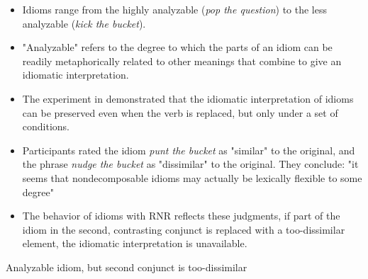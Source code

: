 \documentclass[paper=letter, fontsize=12pt]{scrartcl} %
\numberwithin{equation}{section} %
\numberwithin{figure}{section} %
\numberwithin{table}{section} %
\begin{document}
\begin{itemize}
\item Idioms range from the highly analyzable (\textit{pop the question}) to the less analyzable (\textit{kick the bucket}). \citep{Gibbs:1989,Svenonius:2005}
\item "Analyzable" refers to the degree to which the parts of an idiom can be readily metaphorically related to other meanings that combine to give an idiomatic interpretation.
\end{itemize}


\begin{itemize}
\item The experiment in \citealt{Hamblin:1999} demonstrated that the idiomatic interpretation of idioms can be preserved even when the verb is replaced, but only under a set of conditions. 
\item Participants rated the idiom \textit{punt the bucket} as "similar" to the original, and the phrase \textit{nudge the bucket} as "dissimilar" to the original. They conclude: "it seems that nondecomposable idioms may actually be lexically flexible to some degree" \cite[33]{Hamblin:1999}
\item The behavior of idioms with RNR reflects these judgments, if part of the idiom in the second, contrasting conjunct is replaced with a too-dissimilar element, the idiomatic interpretation is unavailable.
\end{itemize}




\begin{exe}
\ex Analyzable idiom, but second conjunct is too-dissimilar
	\begin{xlista}
	\end{xlista}
\end{exe}
\end{document}
